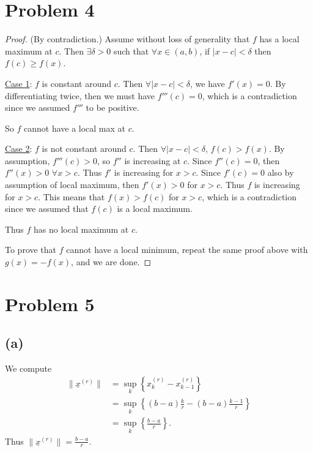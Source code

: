 \documentclass{article}
\begin{document}
\section*{Problem 4}
\begin{proof}
	(By contradiction.) Assume without loss of generality that $f$ has a local maximum at $c$. Then $\exists \delta > 0$ such that $\forall x \in (a, b)$, if $|x - c| < \delta$ then $f(c) \geq f(x)$.
	
	\underline{Case 1}: $f$ is constant around $c$. Then $\forall |x - c| < \delta$, we have $f'(x) = 0$. By differentiating twice, then we must have $f'''(c) = 0$, which is a contradiction since we assumed $f'''$ to be positive.
	
	So $f$ cannot have a local max at $c$.
	
	\underline{Case 2}: $f$ is not constant around $c$. Then $\forall |x - c| < \delta$, $f(c) > f(x)$. By assumption, $f'''(c) > 0$, so $f''$ is increasing at $c$. Since $f''(c) = 0$, then $f''(x) > 0$ $\forall x > c$. Thus $f'$ is increasing for $x > c$. Since $f'(c)=0$ also by assumption of local maximum, then $f'(x) > 0$ for $x > c$. Thus $f$ is increasing for $x > c$. This means that $f(x) > f(c)$ for $x > c$, which is a contradiction since we assumed that $f(c)$ is a local maximum.
	
	Thus $f$ has no local maximum at $c$. 
	
	To prove that $f$ cannot have a local minimum, repeat the same proof above with $g(x) = -f(x)$, and we are done.
\end{proof}
\section*{Problem 5}
\subsection*{(a)}
We compute
\begin{align}
	\|\underline{x}^{(r)}\| &= \sup_k \left\{x_k^{(r)} - x_{k-1}^{(r)}\right\} \\
	&= \sup_k \left\{(b - a)\frac{k}{r} - (b-a)\frac{k-1}{r}\right\} \\
	&= \sup_k \left\{\frac{b-a}{r}\right\}.
\end{align}
Thus $\|\underline{x}^{(r)}\| = \frac{b-a}{r}$.
\end{document}
